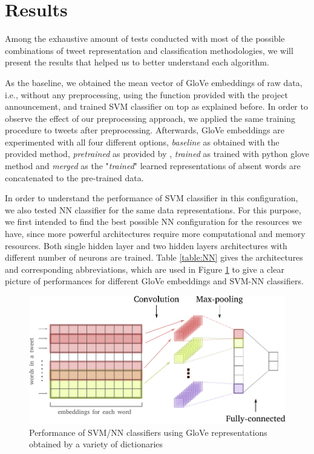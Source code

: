 \section{Results}
\label{sec:results}
Among the exhaustive amount of tests conducted with most of the possible combinations of tweet representation and classification methodologies, we will present the results that helped us to better understand each algorithm.

As the baseline, we obtained the mean vector of GloVe embeddings of raw data, i.e., without any preprocessing, using the function provided with the project announcement, and trained SVM classifier on top as explained before.
In order to observe the effect of our preprocessing approach, we applied the same training procedure to tweets after preprocessing.
Afterwards, GloVe embeddings are experimented with all four different options, \textit{baseline} as obtained with the provided method, \textit{pretrained} as provided by \cite{pennington2014glove}, \textit{trained} as trained with python glove method and \textit{merged} as the "\textit{trained}" learned representations of absent words are concatenated to the pre-trained data.

In order to understand the performance of SVM classifier in this configuration, we also tested NN classifier for the same data representations.
For this purpose, we first intended to find the best possible NN configuration for the resources we have, since more powerful architectures require more computational and memory resources.
Both single hidden layer and two hidden layers architectures with different number of neurons are trained.
Table \ref{table:NN} gives the architectures and corresponding abbreviations, which are used in Figure \ref{fig:perf1} to give a clear picture of performances for different GloVe embeddings and SVM-NN classifiers.



\begin{figure}[h!]
	\centering
	\includegraphics[width=\columnwidth]{CNN_text.pdf}
	\caption{Performance of SVM/NN classifiers using GloVe representations obtained by a variety of dictionaries}
	\label{fig:perf1}
\end{figure}


